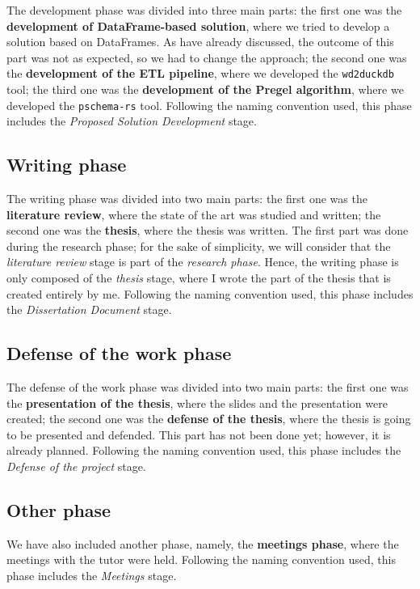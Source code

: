The development phase was divided into three main parts: the first one was the \textbf{development of DataFrame-based solution}, where we tried to develop a solution based on DataFrames. As have already discussed, the outcome of this part was not as expected, so we had to change the approach; the second one was the \textbf{development of the ETL pipeline}, where we developed the \texttt{wd2duckdb} tool; the third one was the \textbf{development of the Pregel algorithm}, where we developed the \texttt{pschema-rs} tool. Following the naming convention used, this phase includes the \textit{Proposed Solution Development} stage.

\subsection{Writing phase}

The writing phase was divided into two main parts: the first one was the \textbf{literature review}, where the state of the art was studied and written; the second one was the \textbf{thesis}, where the thesis was written. The first part was done during the research phase; for the sake of simplicity, we will consider that the \textit{literature review} stage is part of the \textit{research phase}. Hence, the writing phase is only composed of the \textit{thesis} stage, where I wrote the part of the thesis that is created entirely by me. Following the naming convention used, this phase includes the \textit{Dissertation Document} stage.

\subsection{Defense of the work phase}

The defense of the work phase was divided into two main parts: the first one was the \textbf{presentation of the thesis}, where the slides and the presentation were created; the second one was the \textbf{defense of the thesis}, where the thesis is going to be presented and defended. This part has not been done yet; however, it is already planned. Following the naming convention used, this phase includes the \textit{Defense of the project} stage.

\subsection{Other phase}

We have also included another phase, namely, the \textbf{meetings phase}, where the meetings with the tutor were held. Following the naming convention used, this phase includes the \textit{Meetings} stage.

